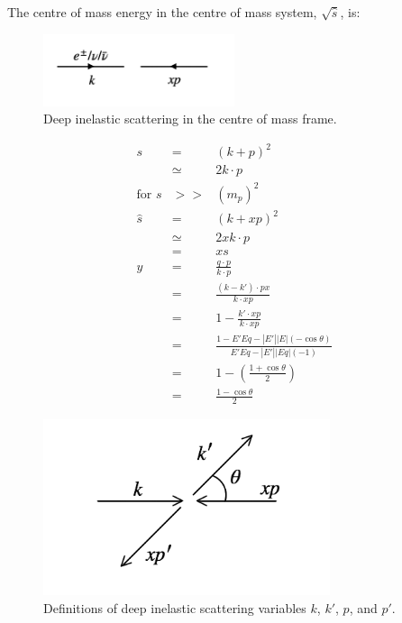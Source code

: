 The centre of mass energy in the centre of mass system, $\sqrt{\hat{s}}$, is:

\begin{figure}[!htb]
  \begin{center}
    \includegraphics[width=0.5\textwidth]{images/web_feynman/image_62.png}
    \caption[CM deep inelastic scattering]{Deep inelastic scattering in the centre of mass frame.}
    \label{fig:ch14_DISCM}
  \end{center}
\end{figure}

\begin{eqnarray*}
  s & = & \left(k + p\right)^2 \\
  & \simeq & 2k \cdot p \\
  \textrm{for } s & >> & \left(m_p\right)^2 \\
  \hat{s} & = & \left(k + xp\right)^2 \\
  & \simeq & 2xk \cdot p \\
  & = & xs \\
  y & = & \frac{q \cdot p}{k \cdot p} \\
  & = & \frac{\left(k - k'\right) \cdot px}{k \cdot xp} \\
  & = & 1 - \frac{k' \cdot xp}{k \cdot xp} \\
  & = & \frac{1 - E'Eq - |E'||E|\left(-\cos\theta\right)}{E'Eq - |E'||Eq|\left(-1\right)} \\
  & = & 1 - \left(\frac{1 + \cos\theta}{2}\right) \\
  & = & \frac{1 - \cos\theta}{2}
\end{eqnarray*}

\begin{figure}[!htb]
  \begin{center}
    \includegraphics[width=0.75\textwidth]{images/web_feynman/image_63.png}
    \caption[Deep inelastic scattering variables]{Definitions of deep inelastic scattering variables $k$, $k'$, $p$, and $p'$.}
    \label{fig:ch14_DISVariables}
  \end{center}
\end{figure}

